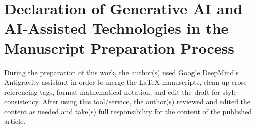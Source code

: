 \documentclass[11pt]{amsart}
\theoremstyle{plain}
\theoremstyle{definition}
\theoremstyle{remark}
\begin{document}
\section*{Declaration of Generative AI and AI-Assisted Technologies in the Manuscript Preparation Process}

During the preparation of this work, the author(s) used Google DeepMind's Antigravity assistant in order to merge the LaTeX manuscripts, clean up cross-referencing tags, format mathematical notation, and edit the draft for style consistency. After using this tool/service, the author(s) reviewed and edited the content as needed and take(s) full responsibility for the content of the published article.




\appendix


\end{document}
